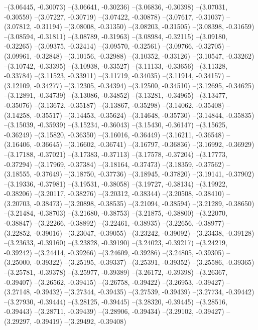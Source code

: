 --(3.06445, -0.30073)
--(3.06641, -0.30236)
--(3.06836, -0.30398)
--(3.07031, -0.30559)
--(3.07227, -0.30719)
--(3.07422, -0.30878)
--(3.07617, -0.31037)
--(3.07812, -0.31194)
--(3.08008, -0.31350)
--(3.08203, -0.31505)
--(3.08398, -0.31659)
--(3.08594, -0.31811)
--(3.08789, -0.31963)
--(3.08984, -0.32115)
--(3.09180, -0.32265)
--(3.09375, -0.32414)
--(3.09570, -0.32561)
--(3.09766, -0.32705)
--(3.09961, -0.32848)
--(3.10156, -0.32988)
--(3.10352, -0.33126)
--(3.10547, -0.33262)
--(3.10742, -0.33395)
--(3.10938, -0.33527)
--(3.11133, -0.33656)
--(3.11328, -0.33784)
--(3.11523, -0.33911)
--(3.11719, -0.34035)
--(3.11914, -0.34157)
--(3.12109, -0.34277)
--(3.12305, -0.34394)
--(3.12500, -0.34510)
--(3.12695, -0.34625)
--(3.12891, -0.34739)
--(3.13086, -0.34852)
--(3.13281, -0.34965)
--(3.13477, -0.35076)
--(3.13672, -0.35187)
--(3.13867, -0.35298)
--(3.14062, -0.35408)
--(3.14258, -0.35517)
--(3.14453, -0.35624)
--(3.14648, -0.35730)
--(3.14844, -0.35835)
--(3.15039, -0.35939)
--(3.15234, -0.36043)
--(3.15430, -0.36147)
--(3.15625, -0.36249)
--(3.15820, -0.36350)
--(3.16016, -0.36449)
--(3.16211, -0.36548)
--(3.16406, -0.36645)
--(3.16602, -0.36741)
--(3.16797, -0.36836)
--(3.16992, -0.36929)
--(3.17188, -0.37021)
--(3.17383, -0.37113)
--(3.17578, -0.37204)
--(3.17773, -0.37294)
--(3.17969, -0.37384)
--(3.18164, -0.37473)
--(3.18359, -0.37562)
--(3.18555, -0.37649)
--(3.18750, -0.37736)
--(3.18945, -0.37820)
--(3.19141, -0.37902)
--(3.19336, -0.37981)
--(3.19531, -0.38058)
--(3.19727, -0.38134)
--(3.19922, -0.38206)
--(3.20117, -0.38276)
--(3.20312, -0.38344)
--(3.20508, -0.38410)
--(3.20703, -0.38473)
--(3.20898, -0.38535)
--(3.21094, -0.38594)
--(3.21289, -0.38650)
--(3.21484, -0.38703)
--(3.21680, -0.38753)
--(3.21875, -0.38800)
--(3.22070, -0.38847)
--(3.22266, -0.38892)
--(3.22461, -0.38935)
--(3.22656, -0.38977)
--(3.22852, -0.39016)
--(3.23047, -0.39055)
--(3.23242, -0.39092)
--(3.23438, -0.39128)
--(3.23633, -0.39160)
--(3.23828, -0.39190)
--(3.24023, -0.39217)
--(3.24219, -0.39242)
--(3.24414, -0.39266)
--(3.24609, -0.39286)
--(3.24805, -0.39305)
--(3.25000, -0.39322)
--(3.25195, -0.39337)
--(3.25391, -0.39352)
--(3.25586, -0.39365)
--(3.25781, -0.39378)
--(3.25977, -0.39389)
--(3.26172, -0.39398)
--(3.26367, -0.39407)
--(3.26562, -0.39415)
--(3.26758, -0.39422)
--(3.26953, -0.39427)
--(3.27148, -0.39432)
--(3.27344, -0.39435)
--(3.27539, -0.39439)
--(3.27734, -0.39442)
--(3.27930, -0.39444)
--(3.28125, -0.39445)
--(3.28320, -0.39445)
--(3.28516, -0.39443)
--(3.28711, -0.39439)
--(3.28906, -0.39434)
--(3.29102, -0.39427)
--(3.29297, -0.39419)
--(3.29492, -0.39408)
